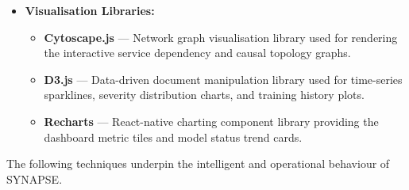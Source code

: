 \begin{itemize}
    \item \textbf{Visualisation Libraries:}
    \begin{itemize}
        \item \textbf{Cytoscape.js} — Network graph visualisation library used for rendering the interactive service dependency and causal topology graphs.
        \item \textbf{D3.js} — Data-driven document manipulation library used for time-series sparklines, severity distribution charts, and training history plots.
        \item \textbf{Recharts} — React-native charting component library providing the dashboard metric tiles and model status trend cards.
    \end{itemize}

\end{itemize}

\hspace*{0.3in} The following techniques underpin the intelligent and operational behaviour of SYNAPSE.

